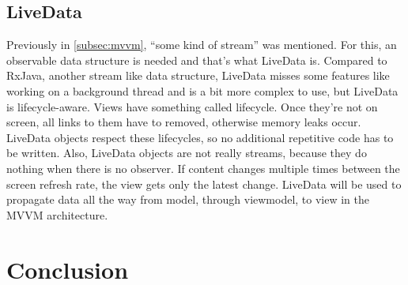 \subsection{LiveData}
Previously in \autoref{subsec:mvvm}, ``some kind of stream'' was mentioned.
For this, an observable data structure is needed and that's what LiveData\cite{livedata} is.
Compared to RxJava\cite{rxjava}, another stream like data structure, LiveData misses some features like working on a background thread and is a bit more complex to use, but LiveData is lifecycle-aware.
Views have something called lifecycle.
Once they're not on screen, all links to them have to removed, otherwise memory leaks occur.
LiveData objects respect these lifecycles, so no additional repetitive code has to be written.
Also, LiveData objects are not really streams, because they do nothing when there is no observer.
If content changes multiple times between  the  screen  refresh  rate,  the  view  gets  only  the  latest  change.
LiveData will be used to propagate data all the way from model, through viewmodel, to view in the MVVM architecture.

\section{Conclusion}

